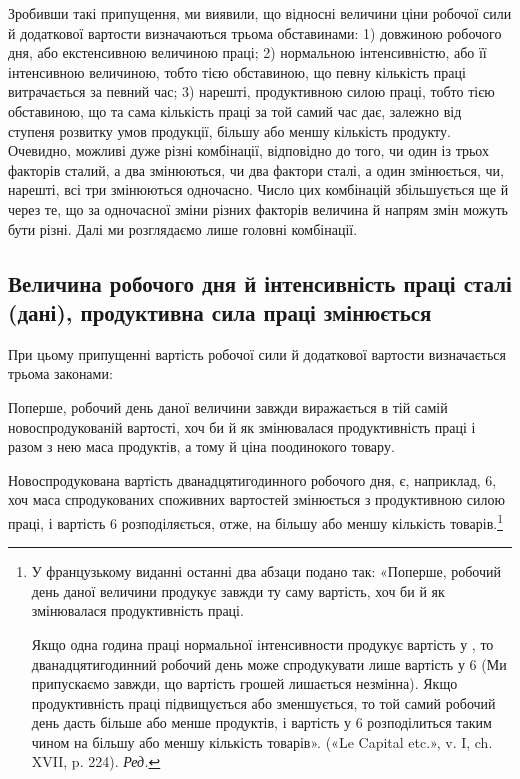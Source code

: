 Зробивши такі припущення, ми виявили, що відносні величини
ціни робочої сили й додаткової вартости визначаються
трьома обставинами: 1) довжиною робочого дня, або екстенсивною
величиною праці; 2) нормальною інтенсивністю, або її інтенсивною
величиною, тобто тією обставиною, що певну кількість
праці витрачається за певний час; 3) нарешті, продуктивною
силою праці, тобто тією обставиною, що та сама кількість праці
за той самий час дає, залежно від ступеня розвитку умов продукції,
більшу або меншу кількість продукту. Очевидно, можливі
дуже різні комбінації, відповідно до того, чи один із трьох факторів
сталий, а два змінюються, чи два фактори сталі, а один
змінюється, чи, нарешті, всі три змінюються одночасно. Число
цих комбінацій збільшується ще й через те, що за одночасної
зміни різних факторів величина й напрям змін можуть бути
різні. Далі ми розглядаємо лише головні комбінації.

\subsection{Величина робочого дня й інтенсивність праці сталі (дані),
продуктивна сила праці змінюється}

При цьому припущенні вартість робочої сили й додаткової
вартости визначається трьома законами:

Поперше, робочий день даної величини завжди виражається
в тій самій новоспродукованій вартості, хоч би й як змінювалася
продуктивність праці і разом з нею маса продуктів, а тому й
ціна поодинокого товару.

Новоспродукована вартість дванадцятигодинного робочого
дня, є, наприклад, 6, хоч маса спродукованих споживних
вартостей змінюється з продуктивною силою праці, і вартість
6 розподіляється, отже, на більшу або меншу кількість
товарів.\footnote*{
У французькому виданні останні два абзаци подано так: «Поперше,
робочий день даної величини продукує завжди ту саму вартість,
хоч би й як змінювалася продуктивність праці.

Якщо одна година праці нормальної інтенсивности продукує вартість
у , то дванадцятигодинний робочий день може спродукувати
лише вартість у 6 (Ми припускаємо завжди, що вартість грошей
лишається незмінна). Якщо продуктивність праці підвищується або зменшується,
то той самий робочий день дасть більше або менше продуктів,
і вартість у 6 розподілиться таким чином на більшу або меншу
кількість товарів». («Le Capital etc.», v. I, ch. XVII, p. 224). \emph{Ред.}
}

